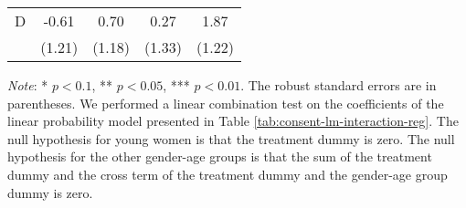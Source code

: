 \documentclass[12pt, a4paper]{article}
\begin{document}
\begin{table}[H]
\begin{threeparttable}
\begin{tabular}[t]{lcccc}
\hspace{1em}D & -0.61 & 0.70 & 0.27 & 1.87\\
\hspace{1em} & (1.21) & (1.18) & (1.33) & (1.22)\\
\bottomrule
\end{tabular}
\begin{tablenotes}
\item \emph{Note}: * $p < 0.1$, ** $p < 0.05$, *** $p < 0.01$. The robust standard errors are in parentheses. We performed a linear combination test on the coefficients of the linear probability model presented in Table \ref{tab:consent-lm-interaction-reg}. The null hypothesis for young women is that the treatment dummy is zero. The null hypothesis for the other gender-age groups is that the sum of the treatment dummy and the cross term of the treatment dummy and the gender-age group dummy is zero.
\end{tablenotes}
\end{threeparttable}
\end{table}
\end{document}
